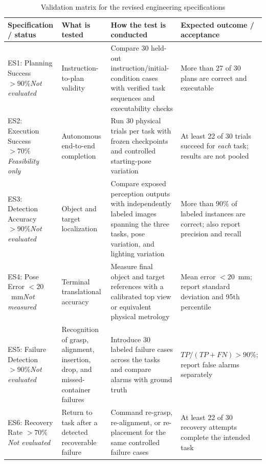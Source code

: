 \documentclass[12pt, letterpaper]{article}
\begin{document}
\begin{table}[t]
\centering
\caption{Validation matrix for the revised engineering specifications}
\label{tab:validation-matrix}
\scriptsize
\setlength{\tabcolsep}{2.5pt}
\renewcommand{\arraystretch}{0.88}
\begin{tabularx}{\textwidth}{>{\raggedright\arraybackslash}p{2.05cm}
>{\raggedright\arraybackslash}p{2.25cm}
>{\raggedright\arraybackslash}X
>{\raggedright\arraybackslash}p{2.55cm}}
\toprule
\textbf{Specification / status} & \textbf{What is tested} &
\textbf{How the test is conducted} & \textbf{Expected outcome / acceptance} \\
\midrule
ES1: Planning Success $>90\%$\newline\emph{Not evaluated} & Instruction-to-plan
validity & Compare 30 held-out instruction/initial-condition cases with
verified task sequences and executability checks & More than 27 of 30 plans
are correct and executable \\
ES2: Execution Success $>70\%$\newline\emph{Feasibility only} & Autonomous
end-to-end completion & Run 30 physical trials per task with frozen checkpoints
and controlled starting-pose variation & At least 22 of 30 trials succeed for
\emph{each} task; results are not pooled \\
ES3: Detection Accuracy $>90\%$\newline\emph{Not evaluated} & Object and target
localization & Compare exposed perception outputs with independently labeled
images spanning the three tasks, pose variation, and lighting variation & More
than $90\%$ of labeled instances are correct; also report precision and recall \\
ES4: Pose Error $<20$~mm\newline\emph{Not measured} & Terminal translational
accuracy & Measure final object and target references with a calibrated top
view or equivalent physical metrology & Mean error $<20$~mm; report standard
deviation and 95th percentile \\
ES5: Failure Detection $>90\%$\newline\emph{Not evaluated} & Recognition of
grasp, alignment, insertion, drop, and missed-container failures & Introduce 30
labeled failure cases across the tasks and compare alarms with ground truth &
$TP/(TP+FN)>90\%$; report false alarms separately \\
ES6: Recovery Rate $>70\%$\newline\emph{Not evaluated} & Return to task after a
detected recoverable failure & Command re-grasp, re-alignment, or re-placement
for the same controlled failure cases & At least 22 of 30 recovery attempts
complete the intended task \\
\bottomrule
\end{tabularx}
\end{table}
\end{document}
